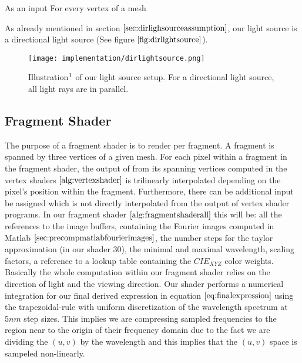 As an input For every vertex of a mesh

As already mentioned in section $\ref{sec:dirlighsourceassumption}$, our light source is a directional light source (See figure $\ref{fig:dirlightsource}$).

\begin{figure}[H]
  \centering
  \texttt{[image: implementation/dirlightsource.png]}
  \caption[Rays of a Directional Light]{Illustration$\footnotemark$ of our light source setup. For a directional light source, all light rays are in parallel.}
  \label{fig:dirlightsource}
\end{figure}

\subsection{Fragment Shader}
\label{sec:fragmentshader}
The purpose of a fragment shader is to render per fragment. A fragment is spanned by three vertices of a given mesh. For each pixel within a fragment in the fragment shader, the output of from its spanning vertices computed in the vertex shaders $\ref{alg:vertexshader}$ is trilinearly interpolated depending on the pixel's position within the fragment. Furthermore, there can be additional input be assigned which is not directly interpolated from the output of vertex shader programs. In our fragment shader $\ref{alg:fragmentshaderall}$ this will be: all the references to the image buffers, containing the Fourier images computed in Matlab $\ref{sec:precompmatlabfourierimages}$, the number steps for the taylor approximation (in our shader 30), the minimal and maximal wavelength, scaling factors, a reference to a lookup table containing the $CIE_{XYZ}$ color weights. Basically the whole computation within our fragment shader relies on the direction of light and the viewing direction. Our shader performs a numerical integration for our final derived expression in equation $\ref{eq:finalexpression}$ using the trapezoidal-rule with uniform discretization of the wavelength spectrum at $5nm$ step sizes. This implies we are compressing sampled frequencies to the region near to the origin of their frequency domain due to the fact we are dividing the $(u,v)$ by the wavelength and this implies that the $(u,v)$ space is sampeled non-linearly. \\

